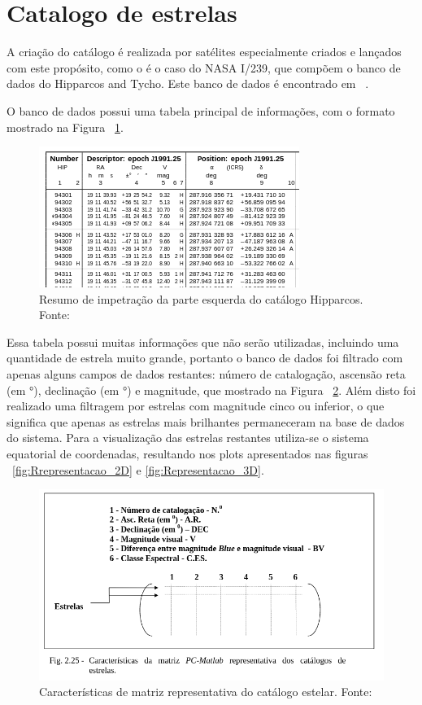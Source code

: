 \section{Catalogo de estrelas}
\label{sec:catalogo_de_estrelas}

A criação do catálogo é realizada por satélites especialmente criados e lançados com este propósito, como o é o caso do NASA I/239, que compõem o banco de dados do Hipparcos and Tycho. Este banco de dados é encontrado em ~\cite[]{ESA}.

O banco de dados possui uma tabela principal de informações, com o formato mostrado na Figura ~\ref{fig:Resumo_impetracao_parte_esquerda_Hipparcos}.

\begin{figure}[H]
	\centering
	\includegraphics[width=.7\columnwidth]{images/Resumo_impetracao_parte_esquerda_Hipparcos.png}
	\caption{Resumo de impetração da parte esquerda do catálogo Hipparcos. Fonte: ~\cite[]{ESA}}
	\label{fig:Resumo_impetracao_parte_esquerda_Hipparcos}
\end{figure}

Essa tabela possui muitas informações que não serão utilizadas, incluindo uma quantidade de estrela muito grande, 
portanto o banco de dados foi filtrado com apenas alguns campos de dados restantes: número de catalogação, ascensão reta (em °), 
declinação (em °) e magnitude, que mostrado na Figura ~\ref{fig:Caracteristicas_matriz}. 
Além disto foi realizado uma filtragem por estrelas com magnitude cinco ou inferior, 
o que significa que apenas as estrelas mais brilhantes permaneceram na base de dados do sistema. 
Para a visualização das estrelas restantes utiliza-se o sistema equatorial de coordenadas, resultando nos plots apresentados nas figuras ~\ref{fig:Rrepresentacao_2D} e \ref{fig:Representacao_3D}.

\begin{figure}[H]
	\centering
	\includegraphics[width=.7\columnwidth, trim={0 60 0 0}, clip]{images/Caracteristicas_matriz.png}
	\caption{Características de matriz representativa do catálogo estelar. Fonte: ~\cite[]{Carvalho}}
	\label{fig:Caracteristicas_matriz}
\end{figure}

